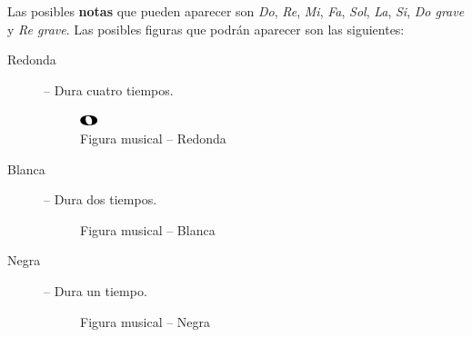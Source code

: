 Las posibles \textbf{notas} que pueden aparecer son \textit{Do}, \textit{Re},
\textit{Mi}, \textit{Fa}, \textit{Sol}, \textit{La}, \textit{Si}, \textit{Do
  grave} y \textit{Re grave}. Las posibles figuras que podrán aparecer son las
siguientes:

\begin{description}
\item[Redonda] -- Dura cuatro tiempos.
\vspace{-0.1cm}
\begin{figure}[h!]
  \centering
  \includegraphics[width=0.05\textwidth]{apendice_manual_usuario/imagen_figRedonda}
  \caption{Figura musical -- Redonda}
\end{figure}

\vspace{-0.35cm}

\item[Blanca] -- Dura dos tiempos.
\vspace{-0.1cm}
\begin{figure}[h!]
  \centering
  \caption{Figura musical -- Blanca}
\end{figure}

\vspace{-0.35cm}

\item[Negra] -- Dura un tiempo.
\vspace{-0.1cm}
\begin{figure}[h!]
  \centering
  \caption{Figura musical -- Negra}
\end{figure}


\end{description}
